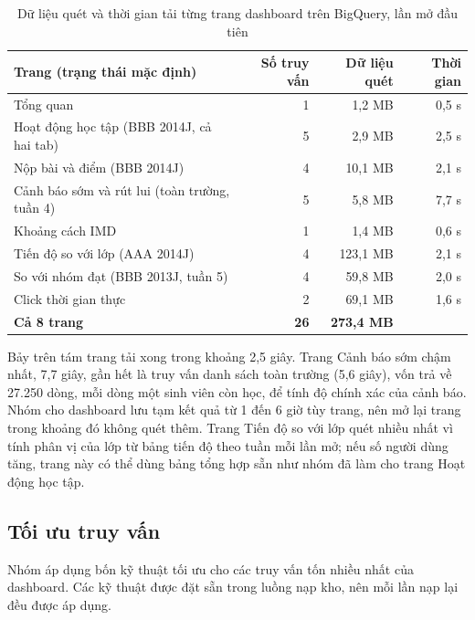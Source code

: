 \begin{table}[htbp]
\centering
\small
\begin{tabularx}{\textwidth}{|X|r|r|r|}
\hline
\textbf{Trang (trạng thái mặc định)} & \textbf{Số truy vấn} & \textbf{Dữ liệu quét} & \textbf{Thời gian} \\ \hline
Tổng quan & 1 & 1,2 MB & 0,5 s \\ \hline
Hoạt động học tập (BBB 2014J, cả hai tab) & 5 & 2,9 MB & 2,5 s \\ \hline
Nộp bài và điểm (BBB 2014J) & 4 & 10,1 MB & 2,1 s \\ \hline
Cảnh báo sớm và rút lui (toàn trường, tuần 4) & 5 & 5,8 MB & 7,7 s \\ \hline
Khoảng cách IMD & 1 & 1,4 MB & 0,6 s \\ \hline
Tiến độ so với lớp (AAA 2014J) & 4 & 123,1 MB & 2,1 s \\ \hline
So với nhóm đạt (BBB 2013J, tuần 5) & 4 & 59,8 MB & 2,0 s \\ \hline
Click thời gian thực & 2 & 69,1 MB & 1,6 s \\ \hline
\textbf{Cả 8 trang} & \textbf{26} & \textbf{273,4 MB} & \\ \hline
\end{tabularx}
\caption{Dữ liệu quét và thời gian tải từng trang dashboard trên BigQuery, lần mở đầu tiên}
\label{tab:khai-thac}
\end{table}

Bảy trên tám trang tải xong trong khoảng 2,5 giây. Trang Cảnh báo sớm chậm nhất, 7,7 giây, gần
hết là truy vấn danh sách toàn trường (5,6 giây), vốn trả về 27.250 dòng, mỗi dòng một sinh viên
còn học, để tính độ chính xác của cảnh báo. Nhóm cho dashboard lưu tạm kết quả từ 1 đến 6 giờ
tùy trang, nên mở lại trang trong khoảng đó không quét thêm. Trang Tiến độ so với lớp quét nhiều nhất vì tính phân vị của lớp từ bảng tiến độ theo tuần mỗi
lần mở; nếu số người dùng tăng, trang này có thể dùng bảng tổng hợp sẵn như nhóm đã làm cho trang
Hoạt động học tập.

\subsection{Tối ưu truy vấn}
\label{sec:toi-uu}

Nhóm áp dụng bốn kỹ thuật tối ưu cho các truy vấn tốn nhiều nhất của dashboard. Các kỹ thuật
được đặt sẵn trong luồng nạp kho, nên mỗi lần nạp lại đều được áp dụng.

